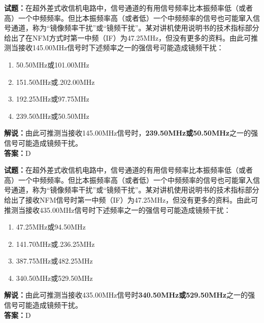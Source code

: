 \documentclass{ctexbook}
\begin{document}
\vspace{1em}

\textbf{试题：}在超外差式收信机电路中，信号通道的有用信号频率比本振频率低（或者高）一个中频频率。但比本振频率高（或者低）一个中频频率的信号也可能窜入信号通道，称为“镜像频率干扰”或“镜频干扰”。某对讲机使用说明书的技术指标部分给出了在NFM方式时第一中频（IF）为47.25\unit{\MHz}，但没有更多的资料。由此可推测当接收145.00\unit{\MHz}信号时下述频率之一的强信号可能造成镜频干扰：%
\begin{enumerate}[leftmargin=3em]
  \item 50.50\unit{\MHz}或101.00\unit{\MHz}
  \item 151.50\unit{\MHz}或.202.00\unit{\MHz}
  \item 192.25\unit{\MHz}或97.75\unit{\MHz}
  \item 239.50\unit{\MHz}或50.50\unit{\MHz}
\end{enumerate}
\noindent\textbf{解说：}由此可推测当接收145.00\unit{\MHz}信号时，\textbf{239.50\unit{\MHz}或50.50\unit{\MHz}}之一的强信号可能造成镜频干扰。\\\noindent\textbf{答案：}D

\vspace{1em}

\textbf{试题：}在超外差式收信机电路中，信号通道的有用信号频率比本振频率低（或者高）一个中频频率。但比本振频率高（或者低）一个中频频率的信号也可能窜入信号通道，称为“镜像频率干扰”或“镜频干扰”。某对讲机使用说明书的技术指标部分给出了接收NFM信号时第一中频（IF）为47.25\unit{\MHz}，但没有更多的资料。由此可推测当接收435.00\unit{\MHz}信号时下述频率之一的强信号可能造成镜频干扰：
\begin{enumerate}[leftmargin=3em]
  \item 47.25\unit{\MHz}或94.50\unit{\MHz}
  \item 141.70\unit{\MHz}或.236.25\unit{\MHz}
  \item 387.75\unit{\MHz}或482.25\unit{\MHz}
  \item 340.50\unit{\MHz}或529.50\unit{\MHz}
\end{enumerate}
\noindent\textbf{解说：}由此可推测当接收435.00\unit{\MHz}信号时\textbf{340.50\unit{\MHz}或529.50\unit{\MHz}}之一的强信号可能造成镜频干扰。\\\noindent\textbf{答案：}D

\vspace{1em}
\end{document}

